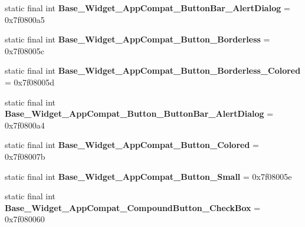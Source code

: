 \begin{DoxyCompactItemize}
\item 
\hypertarget{classandroid_1_1support_1_1design_1_1_r_1_1style_a683c70b9226720a79c12a2be03fb2858}{}static final int {\bfseries Base\+\_\+\+Widget\+\_\+\+App\+Compat\+\_\+\+Button\+Bar\+\_\+\+Alert\+Dialog} = 0x7f0800a5\label{classandroid_1_1support_1_1design_1_1_r_1_1style_a683c70b9226720a79c12a2be03fb2858}

\item 
\hypertarget{classandroid_1_1support_1_1design_1_1_r_1_1style_aa9a41e0b3b102853a8a329a7fe7e322a}{}static final int {\bfseries Base\+\_\+\+Widget\+\_\+\+App\+Compat\+\_\+\+Button\+\_\+\+Borderless} = 0x7f08005c\label{classandroid_1_1support_1_1design_1_1_r_1_1style_aa9a41e0b3b102853a8a329a7fe7e322a}

\item 
\hypertarget{classandroid_1_1support_1_1design_1_1_r_1_1style_a492ab5e68241a223be03eb05c7c0a394}{}static final int {\bfseries Base\+\_\+\+Widget\+\_\+\+App\+Compat\+\_\+\+Button\+\_\+\+Borderless\+\_\+\+Colored} = 0x7f08005d\label{classandroid_1_1support_1_1design_1_1_r_1_1style_a492ab5e68241a223be03eb05c7c0a394}

\item 
\hypertarget{classandroid_1_1support_1_1design_1_1_r_1_1style_a741cde0e312b8362ca9dfc60e04349c9}{}static final int {\bfseries Base\+\_\+\+Widget\+\_\+\+App\+Compat\+\_\+\+Button\+\_\+\+Button\+Bar\+\_\+\+Alert\+Dialog} = 0x7f0800a4\label{classandroid_1_1support_1_1design_1_1_r_1_1style_a741cde0e312b8362ca9dfc60e04349c9}

\item 
\hypertarget{classandroid_1_1support_1_1design_1_1_r_1_1style_ad08fe86bdef40d5490165e9498049f1e}{}static final int {\bfseries Base\+\_\+\+Widget\+\_\+\+App\+Compat\+\_\+\+Button\+\_\+\+Colored} = 0x7f08007b\label{classandroid_1_1support_1_1design_1_1_r_1_1style_ad08fe86bdef40d5490165e9498049f1e}

\item 
\hypertarget{classandroid_1_1support_1_1design_1_1_r_1_1style_af4fe17666ae12ade0cc5dccc4e73d81c}{}static final int {\bfseries Base\+\_\+\+Widget\+\_\+\+App\+Compat\+\_\+\+Button\+\_\+\+Small} = 0x7f08005e\label{classandroid_1_1support_1_1design_1_1_r_1_1style_af4fe17666ae12ade0cc5dccc4e73d81c}

\item 
\hypertarget{classandroid_1_1support_1_1design_1_1_r_1_1style_a5a7e703fc8df208a54098fb7c9b33df3}{}static final int {\bfseries Base\+\_\+\+Widget\+\_\+\+App\+Compat\+\_\+\+Compound\+Button\+\_\+\+Check\+Box} = 0x7f080060\label{classandroid_1_1support_1_1design_1_1_r_1_1style_a5a7e703fc8df208a54098fb7c9b33df3}


\end{DoxyCompactItemize}

